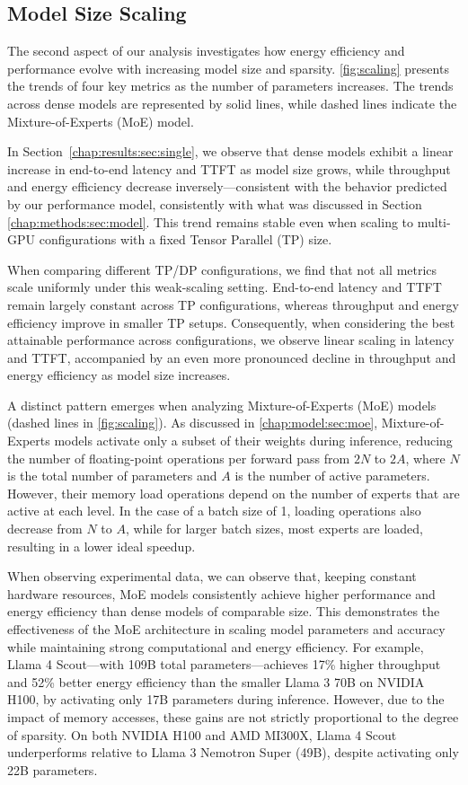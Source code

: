 \subsection{Model Size  Scaling}
The second aspect of our analysis investigates how energy efficiency and performance evolve with increasing model size and sparsity. \ref{fig:scaling} presents the trends of four key metrics as the number of parameters increases. The trends across dense models are represented by solid lines, while dashed lines indicate the Mixture-of-Experts (MoE) model.

In Section~\ref{chap:results:sec:single}, we observe that dense models exhibit a linear increase in end-to-end latency and TTFT as model size grows, while throughput and energy efficiency decrease inversely—consistent with the behavior predicted by our performance model, consistently with what was discussed in Section \ref{chap:methods:sec:model}. This trend remains stable even when scaling to multi-GPU configurations with a fixed Tensor Parallel (TP) size.

When comparing different TP/DP configurations, we find that not all metrics scale uniformly under this weak-scaling setting. End-to-end latency and TTFT remain largely constant across TP configurations, whereas throughput and energy efficiency improve in smaller TP setups. Consequently, when considering the best attainable performance across configurations, we observe linear scaling in latency and TTFT, accompanied by an even more pronounced decline in throughput and energy efficiency as model size increases.

A distinct pattern emerges when analyzing Mixture-of-Experts (MoE) models (dashed lines in \ref{fig:scaling}). 
As discussed in \ref{chap:model:sec:moe}, Mixture-of-Experts models activate only a subset of their weights during inference, reducing the number of floating-point operations per forward pass from $2N$ to $2A$, where $N$ is the total number of parameters and $A$ is the number of active parameters. However, their memory load operations depend on the number of experts that are active at each level. In the case of a batch size of 1, loading operations also decrease from $N$ to $A$, while for larger batch sizes, most experts are loaded, resulting in a lower ideal speedup.

When observing experimental data, we can observe that, keeping constant hardware resources, MoE models consistently achieve higher performance and energy efficiency than dense models of comparable size. This demonstrates the effectiveness of the MoE architecture in scaling model parameters and accuracy while maintaining strong computational and energy efficiency. For example, Llama 4 Scout—with 109B total parameters—achieves 17\% higher throughput and 52\% better energy efficiency than the smaller Llama 3 70B on NVIDIA H100, by activating only 17B parameters during inference.
However, due to the impact of memory accesses, these gains are not strictly proportional to the degree of sparsity. On both NVIDIA H100 and AMD MI300X, Llama 4 Scout underperforms relative to Llama 3 Nemotron Super (49B), despite activating only 22B parameters.

